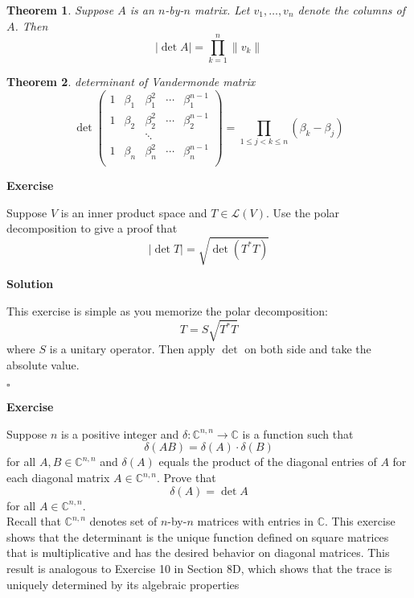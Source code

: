 \documentclass{article}
\newtheorem{theorem}{Theorem}[subsection]
\newenvironment{exercise}{%
{\textbf{Exercise\\}
    }
}{
}
\newenvironment{solution}{%
{
    \textbf{Solution\\}
    }
}{
  \hfill $\square$ 
  \par\bigskip 
}
\newcommand{\CC}{\mathbb{C}}
\begin{document}
\begin{CJK}{UTF8}{gkai}
\begin{theorem}
    Suppose $A$ is an $n$-by-$n$ matrix. Let $v_1,\ldots,v_n$ denote the columns of $A$. Then
    \[|\det A| = \prod_{k = 1}^n \|v_k\|\]
\end{theorem}

\begin{theorem}
    determinant of Vandermonde matrix\\
    \[\det \begin{pmatrix}
        1&\beta_1&\beta_1^2&\cdots&\beta_1^{n-1}\\
        1&\beta_2&\beta_2^2&\cdots&\beta_2^{n-1}\\
        &&\ddots&&\\
        1&\beta_n&\beta_n^2&\cdots&\beta_n^{n-1}\\
    \end{pmatrix} = \prod_{1\leq j < k \leq n} (\beta_k - \beta_j)\]
\end{theorem}

\begin{exercise}
    Suppose $V$ is an inner product space and $T \in \mathcal{L}(V)$. Use the polar decomposition to give a proof that
    \[|\det T| = \sqrt{ \det(T^\ast T)}\]
\end{exercise}

\begin{solution}
    This exercise is simple as you memorize the polar decomposition:
    \[T = S \sqrt{T^\ast T}\]
    where $S$ is a unitary operator.
    Then apply $\det$ on both side and take the absolute value.
\end{solution}

\begin{exercise}
    Suppose $n$ is a positive integer and $\delta: \CC^{n,n} \to \CC$ is a function such that
    \[\delta(AB) = \delta(A)\cdot\delta(B)\]
    for all $A,B \in \CC^{n,n}$ and $\delta(A)$ equals the product of the diagonal entries of $A$ for each diagonal matrix $A \in \CC^{n,n}$. Prove that
    \[\delta(A) = \det A\]
    for all $A \in \CC^{n,n}$.\\

    Recall that $\CC^{n,n}$ denotes set of $n$-by-$n$ matrices with entries in $\CC$. This exercise shows that the determinant is the unique function defined on square matrices that is multiplicative and has the desired behavior on diagonal matrices. This result is analogous to Exercise 10 in Section 8D, which shows that the trace is uniquely determined by its algebraic properties
\end{exercise}


\end{CJK}
\end{document}
